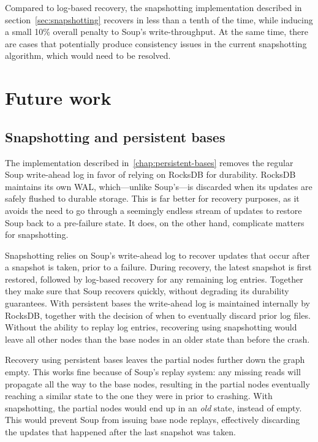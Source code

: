 Compared to log-based recovery, the snapshotting implementation described in
section~\ref{sec:snapshotting} recovers in less than a tenth of the time, while
inducing a small 10\% overall penalty to Soup's write-throughput. At the same
time, there are cases that potentially produce consistency issues in the current
snapshotting algorithm, which would need to be resolved.



\section{Future work}\label{sec:future-work}

\subsection{Snapshotting and persistent bases}

The  implementation described
in~\ref{chap:persistent-bases} removes the regular Soup write-ahead log in favor
of relying on RocksDB for durability. RocksDB maintains its own WAL,
which---unlike Soup's---is discarded when its updates are safely flushed to
durable storage. This is far better for recovery purposes, as it avoids the need
to go through a seemingly endless stream of updates to restore Soup back to a
pre-failure state. It does, on the other hand, complicate matters for
snapshotting.

Snapshotting relies on Soup's write-ahead log to recover updates that occur
after a snapshot is taken, prior to a failure. During recovery, the latest
snapshot is first restored, followed by log-based recovery for any remaining log
entries. Together they make sure that Soup recovers quickly, without degrading
its durability guarantees. With persistent bases the write-ahead log is
maintained internally by RocksDB, together with the decision of when to
eventually discard prior log files. Without the ability to replay log entries,
recovering using snapshotting would leave all other nodes than the base nodes in
an older state than before the crash.

Recovery using persistent bases leaves the partial nodes further down the graph
empty. This works fine because of Soup's replay system: any missing reads will
propagate all the way to the base nodes, resulting in the partial nodes
eventually reaching a similar state to the one they were in prior to crashing.
With snapshotting, the partial nodes would end up in an \textit{old} state,
instead of empty. This would prevent Soup from issuing base node replays,
effectively discarding the updates that happened after the last snapshot was
taken.

